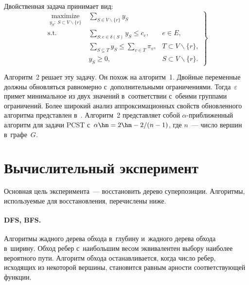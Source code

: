 \begin{multicols}{2}
Двойственная задача принимает вид:
\begin{equation}
\left.
\begin{array}{rll}
\underset{\substack{y_S:~S\subset V\backslash\{r\}}}{\mbox{maximize}} & 
\displaystyle \sum\limits_{S\in V\backslash\{r\}}y_S &\\[6pt]
\mbox{s.t.} & \displaystyle \sum\limits_{S:e\in\delta(S)}y_S\leqslant c_e , & e\in 
E,\\[6pt]
& \displaystyle \sum\limits_{S\subseteq T}y_S\leqslant \sum\limits_{v\in T}\pi_v, & T\subset 
V\backslash\{r\},\\[6pt]
& y_S\geqslant 0, & S\subset V\backslash\{r\}.
\end{array}
\right\}
\label{rd_pcst_inord}
\end{equation}

Алгоритм~2 решает эту задачу. Он похож на 
алгоритм~1. Двойные переменные должны обновляться равномерно 
с~дополнительными ограничениями. Тогда~$\varepsilon$ примет минимальное из двух 
значений в~соответствии с~обеими группами ограничений.
Более широкий анализ аппроксимационных свойств обновленного алгоритма 
представлен в~\cite{goemans1995general}. Алгоритм~2 представляет 
собой $\alpha$-приближенный алгоритм для задачи PCST с~$\alpha \hm= 2 \hm- 
{2}/({n-1})$, где $n$~--- число вершин в~графе~$G$.

\vspace*{-9pt}

\section{Вычислительный эксперимент}

\vspace*{-3pt}

Основная цель эксперимента~--- восстановить дерево суперпозиции. Алгоритмы, 
используемые для восстановления, перечислены ниже.

\vspace*{-12pt}

\paragraph*{DFS, BFS.}
Алгоритмы жадного дерева обхода в~глубину и~жадного дерева обхода в~ширину. 
Обход ребер с~наибольшим весом эквивалентен выбору наиболее вероятного пути. 
Алгоритм обхода останавливается, когда число ребер, исходящих из некоторой 
вершины, становится равным арности соответствующей функции.


\end{multicols}
